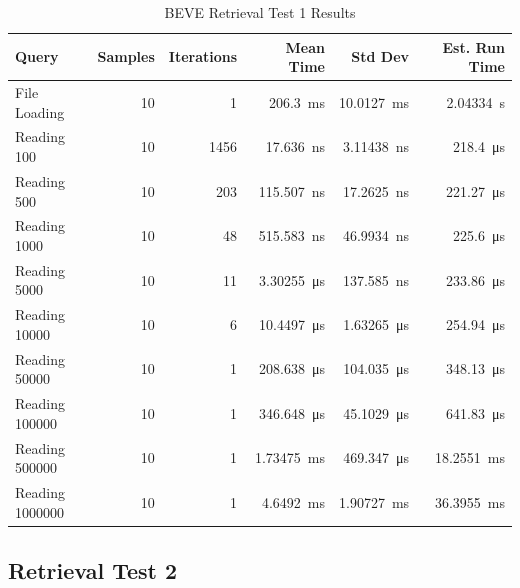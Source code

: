 \documentclass[14pt,a4paper]{article}
\begin{document}
    \begin{table}[H]
        \centering        
        \begin{tabular}{lrrrrr}
            \toprule
            \textbf{Query} & \textbf{Samples} & \textbf{Iterations} & \textbf{Mean Time} & \textbf{Std Dev} & \textbf{Est. Run Time} \\
            \midrule
            File Loading & 10 & 1 & \qty{206.3}{\milli\second} & \qty{10.0127}{\milli\second} & \qty{2.04334}{\second} \\
            Reading 100 & 10 & 1456 & \qty{17.636}{\nano\second} & \qty{3.11438}{\nano\second} & \qty{218.4}{\micro\second} \\
            Reading 500 & 10 & 203 & \qty{115.507}{\nano\second} & \qty{17.2625}{\nano\second} & \qty{221.27}{\micro\second} \\
            Reading 1000 & 10 & 48 & \qty{515.583}{\nano\second} & \qty{46.9934}{\nano\second} & \qty{225.6}{\micro\second} \\
            Reading 5000 & 10 & 11 & \qty{3.30255}{\micro\second} & \qty{137.585}{\nano\second} & \qty{233.86}{\micro\second} \\
            Reading 10000 & 10 & 6 & \qty{10.4497}{\micro\second} & \qty{1.63265}{\micro\second} & \qty{254.94}{\micro\second} \\
            Reading 50000 & 10 & 1 & \qty{208.638}{\micro\second} & \qty{104.035}{\micro\second} & \qty{348.13}{\micro\second} \\
            Reading 100000 & 10 & 1 & \qty{346.648}{\micro\second} & \qty{45.1029}{\micro\second} & \qty{641.83}{\micro\second} \\
            Reading 500000 & 10 & 1 & \qty{1.73475}{\milli\second} & \qty{469.347}{\micro\second} & \qty{18.2551}{\milli\second} \\
            Reading 1000000 & 10 & 1 & \qty{4.6492}{\milli\second} & \qty{1.90727}{\milli\second} & \qty{36.3955}{\milli\second} \\
            \bottomrule
        \end{tabular}
        \caption{BEVE Retrieval Test 1 Results}
    \end{table}
    
    \subsection{Retrieval Test 2}
    
\end{document}
